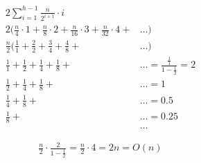 \documentclass{article}
\begin{document}
    \begin{align*}
        2 \sum_{i=1}^{h-1} \frac{n}{2^{i+1}} \cdot i                                                 &                                               \\
        2 (\frac{n}{4} \cdot 1 + \frac{n}{8} \cdot 2 + \frac{n}{16} \cdot 3 + \frac{n}{32} \cdot 4 + & \dots)                                        \\
        \frac{n}{2} (\frac{1}{1} + \frac{2}{2} + \frac{3}{4} + \frac{4}{8} +                         & \dots)                                        \\
        \frac{1}{1} +  \frac{1}{2} +  \frac{1}{4} +  \frac{1}{8} +                                   & \dots = \frac{\frac{1}{1}}{1-\frac{1}{2}} = 2 \\
        \frac{1}{2} +  \frac{1}{4} +  \frac{1}{8} +                                                  & \dots = 1                                     \\
        \frac{1}{4} +  \frac{1}{8} +                                                                 & \dots = 0.5                                   \\
        \frac{1}{8} +                                                                                & \dots = 0.25                                  \\
                                                                                                     & \dots
    \end{align*}

    \begin{gather*}
        \frac{n}{2} \cdot \frac{2}{1-\frac{1}{2}} = \frac{n}{2} \cdot 4 = 2n = O(n)
    \end{gather*}
    
\end{document}
